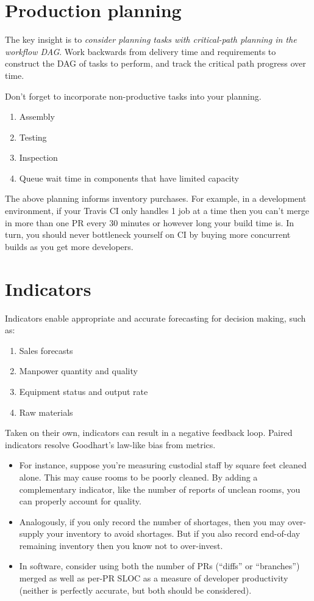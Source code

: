 \documentclass{article}
\begin{document}
\section{Production planning}

The key insight is to \textit{consider planning tasks with critical-path planning in the workflow DAG}. Work backwards from delivery time and requirements to construct the DAG of tasks to perform, and track the critical path progress over time.

Don’t forget to incorporate non-productive tasks into your planning.
\begin{enumerate}
\item Assembly
\item Testing
\item Inspection
\item Queue wait time in components that have limited capacity
\end{enumerate}

The above planning informs inventory purchases. For example, in a development environment, if your Travis CI only handles 1 job at a time then you can’t merge in more than one PR every 30 minutes or however long your build time is. In turn, you should never bottleneck yourself on CI by buying more concurrent builds as you get more developers.

\section{Indicators}

Indicators enable appropriate and accurate forecasting for decision making, such as:

\begin{enumerate}
\item Sales forecasts
\item Manpower quantity and quality
\item Equipment status and output rate
\item Raw materials
\end{enumerate}

Taken on their own, indicators can result in a negative feedback loop. Paired indicators resolve Goodhart’s law-like bias from metrics. 

\begin{itemize}
\item For instance, suppose you’re measuring custodial staff by square feet cleaned alone. This may cause rooms to be poorly cleaned. By adding a complementary indicator, like the number of reports of unclean rooms, you can properly account for quality.
\item Analogously, if you only record the number of shortages, then you may over-supply your inventory to avoid shortages. But if you also record end-of-day remaining inventory then you know not to over-invest.
\item In software, consider using both the number of PRs (``diffs'' or ``branches'') merged as well as per-PR SLOC as a measure of developer productivity (neither is perfectly accurate, but both should be considered).
\end{itemize}
\end{document}
